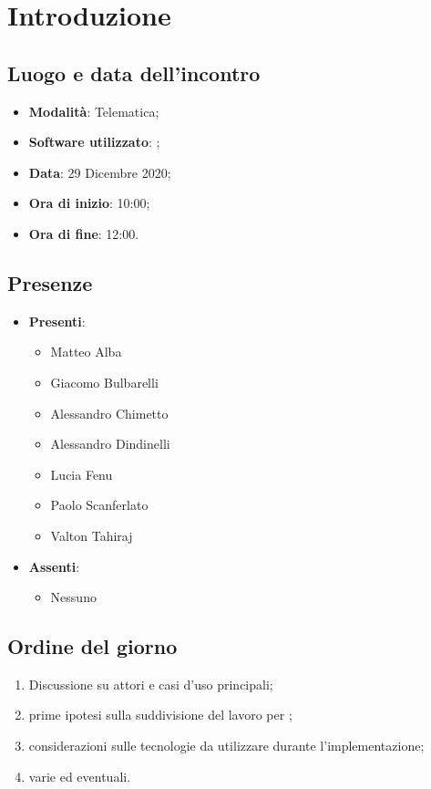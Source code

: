 \documentclass[]{article}
\begin{document}
	

	\newpage

	\section{Introduzione}
		\subsection{Luogo e data dell'incontro}
		\begin{itemize}
			\item \textbf{Modalità}: Telematica;
			\item \textbf{Software utilizzato}: ;
			\item \textbf{Data}: 29 Dicembre 2020;
			\item \textbf{Ora di inizio}: 10:00;
			\item \textbf{Ora di fine}: 12:00.
		\end{itemize}

		\subsection{Presenze}
		\begin{itemize}
			\item \textbf{Presenti}:
		\begin{itemize}
			\item Matteo Alba
			\item Giacomo Bulbarelli
			\item Alessandro Chimetto
			\item Alessandro Dindinelli
			\item Lucia Fenu
			\item Paolo Scanferlato
			\item Valton Tahiraj
		\end{itemize}
			\item \textbf{Assenti}:
			\begin{itemize}
				\item Nessuno
			\end{itemize}
		\end{itemize}

		\subsection{Ordine del giorno}
		\begin{enumerate}
			\item Discussione su attori e casi d'uso principali;
            \item prime ipotesi sulla suddivisione del lavoro per ;
            \item considerazioni sulle tecnologie da utilizzare durante l'implementazione;
            \item varie ed eventuali.
		\end{enumerate}
\end{document}
